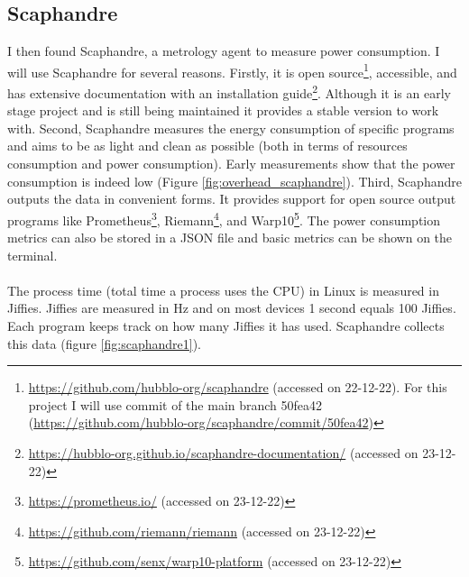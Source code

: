 \documentclass[../thesis.tex]{subfiles}
\begin{document}
\subsection{Scaphandre}
I then found Scaphandre, a metrology agent to measure power consumption. I will use Scaphandre for several reasons. Firstly, it is open source\footnote{\url{https://github.com/hubblo-org/scaphandre} (accessed on 22-12-22). For this project I will use commit of the main branch 50fea42 (\url{https://github.com/hubblo-org/scaphandre/commit/50fea42})}, accessible, and has extensive documentation with an installation guide\footnote{\url{https://hubblo-org.github.io/scaphandre-documentation/} (accessed on 23-12-22)}. Although it is an early stage project and is still being maintained it provides a stable version to work with. Second, Scaphandre measures the energy consumption of specific programs and aims to be as light and clean as possible (both in terms of resources consumption and power consumption). Early measurements show that the power consumption is indeed low (Figure \ref{fig:overhead_scaphandre}). Third, Scaphandre outputs the data in convenient forms. It provides support for open source output programs like Prometheus\footnote{\url{https://prometheus.io/} (accessed on 23-12-22)}, Riemann\footnote{\url{https://github.com/riemann/riemann} (accessed on 23-12-22)}, and Warp10\footnote{\url{https://github.com/senx/warp10-platform} (accessed on 23-12-22)}. The power consumption metrics can also be stored in a JSON file and basic metrics can be shown on the terminal. \paragraph{}

The process time (total time a process uses the CPU) in Linux is measured in Jiffies. Jiffies are measured in Hz and on most devices 1 second equals 100 Jiffies. Each program keeps track on how many Jiffies it has used. Scaphandre collects this data (figure \ref{fig:scaphandre1}).
\end{document}
